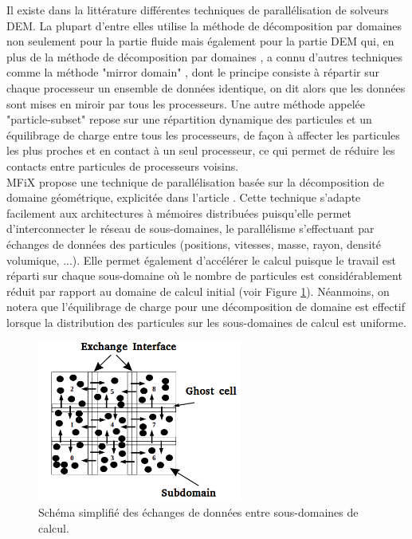 Il existe dans la littérature différentes techniques de parallélisation de solveurs DEM. La plupart d'entre elles utilise la méthode de décomposition par domaines non seulement pour la partie fluide mais également pour la partie DEM qui, en plus de la méthode de décomposition par domaines \cite{plimpton1995fast,kavcianauskas2010parallel}, a connu d'autres techniques comme la méthode "mirror domain" \cite{darmana2006parallelization,washington2003micro}, dont le principe consiste à répartir sur chaque processeur un ensemble de données identique, on dit alors que les données sont mises en miroir par tous les processeurs. Une autre méthode appelée "particle-subset" \cite{kafui2011parallelization,plimpton1995fast} repose sur une répartition dynamique des particules et un équilibrage de charge entre tous les processeurs, de façon à affecter les particules les plus proches et en contact à un seul processeur, ce qui permet de réduire les contacts entre particules de processeurs voisins.\\

MFiX propose une technique de parallélisation basée sur la décomposition de domaine géométrique, explicitée dans l'article \cite{gopalakrishnan2013development}. Cette technique s'adapte facilement aux architectures à mémoires distribuées puisqu'elle permet d'interconnecter le réseau de sous-domaines, le parallélisme s'effectuant par échanges de données des particules (positions, vitesses, masse, rayon, densité volumique, ...). Elle permet également d'accélérer le calcul puisque le travail est réparti sur chaque sous-domaine où le nombre de particules est considérablement réduit par rapport au domaine de calcul initial (voir Figure \ref{fig7}). Néanmoins, on notera que l'équilibrage de charge pour une décomposition de domaine est effectif lorsque la distribution des particules sur les sous-domaines de calcul est uniforme.

\begin{figure}[!h]
        \centering
        \includegraphics[width=0.6\textwidth]{chapitres/chapitre_4/figures/decomposition-echanges.png}
        \caption{Schéma simplifié des échanges de données entre sous-domaines de calcul.}
        \label{fig7}    
    \end{figure}

